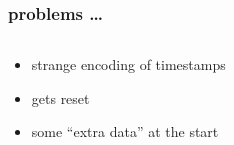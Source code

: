 \documentclass[table,xcolor=dvipsnames,professionalfonts]{beamer}
\begin{document}
\begin{frame}[t]
  \frametitle{problems \dots}
  \begin{columns}
    \begin{column}{.5\textwidth}
      \begin{alertblock}{}
        \begin{itemize}
            \item<2-> strange encoding of timestamps
            \item<2-> gets reset
            \item<2-> some ``extra data'' at the start
        \end{itemize}
      \end{alertblock}
  \end{column}
  \begin{column}{.5\textwidth}

\end{column}
\end{columns}
\end{frame}
\end{document}
